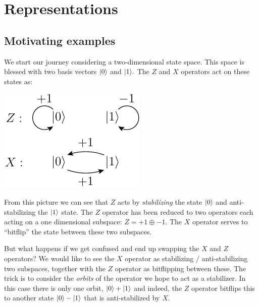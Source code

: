 \section{Representations}

\subsection{Motivating examples}


We start our journey considering a two-dimensional state space.
This space is blessed with two basis vectors $|{0}\rangle$ and $|{1}\rangle.$
The $Z$ and $X$ operators act on these states as:
\begin{center}
\includegraphics[]{pic-zx.pdf}
\end{center}
From this picture we can see that $Z$ acts by \emph{stabilizing} the
state $|{0}\rangle$ and anti-stabilizing the $|{1}\rangle$ state.
The $Z$ operator has been reduced 
to two operators each acting on a one dimensional subspace:
$Z = +1 \oplus -1.$
The $X$ operator serves to ``bitflip'' the state between
these two subspaces.

But what happens if we get confused and end up swapping
the $X$ and $Z$ operators? We would like to see the $X$ operator
as stabilizing / anti-stabilizing two subspaces, together with the
$Z$ operator as bitflipping between these.
The trick is to consider the \emph{orbits} of the operator
we hope to act as a stabilizer.
In this case there is only one orbit, $|{0}\rangle+|{1}\rangle$
and indeed, the $Z$ operator bitflips this to another state
$|{0}\rangle-|{1}\rangle$ that is anti-stabilized by $X.$

